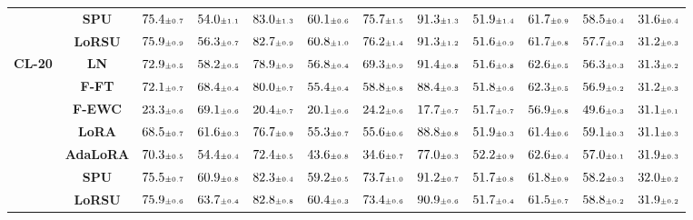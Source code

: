 \begin{table}
\begin{center}
\begin{small}
\begin{tabular}{l c c c c c c c c c c c}
& \textbf{SPU} & $75.4 \mtiny{\pm 0.7}$ & $54.0 \mtiny{\pm 1.1}$ & $83.0 \mtiny{\pm 1.3}$ & $60.1 \mtiny{\pm 0.6}$ & $75.7 \mtiny{\pm 1.5}$ & $91.3 \mtiny{\pm 1.3}$ & $51.9 \mtiny{\pm 1.4}$ & $61.7 \mtiny{\pm 0.9}$ & $58.5 \mtiny{\pm 0.4}$ & $31.6 \mtiny{\pm 0.4}$ \\
& \textbf{LoRSU} & $75.9 \mtiny{\pm 0.9}$ & $56.3 \mtiny{\pm 0.7}$ & $82.7 \mtiny{\pm 0.9}$ & $60.8 \mtiny{\pm 1.0}$ & $76.2 \mtiny{\pm 1.4}$ & $91.3 \mtiny{\pm 1.2}$ & $51.6 \mtiny{\pm 0.9}$ & $61.7 \mtiny{\pm 0.8}$ & $57.7 \mtiny{\pm 0.3}$ & $31.2 \mtiny{\pm 0.3}$ \\
\midrule
\multirow{7}{*}{\textbf{CL-20}} & \textbf{LN} & $72.9 \mtiny{\pm 0.5}$ & $58.2 \mtiny{\pm 0.5}$ & $78.9 \mtiny{\pm 0.9}$ & $56.8 \mtiny{\pm 0.4}$ & $69.3 \mtiny{\pm 0.9}$ & $91.4 \mtiny{\pm 0.8}$ & $51.6 \mtiny{\pm 0.8}$ & $62.6 \mtiny{\pm 0.5}$ & $56.3 \mtiny{\pm 0.3}$ & $31.3 \mtiny{\pm 0.2}$ \\
& \textbf{F-FT} & $72.1 \mtiny{\pm 0.7}$ & $68.4 \mtiny{\pm 0.4}$ & $80.0 \mtiny{\pm 0.7}$ & $55.4 \mtiny{\pm 0.4}$ & $58.8 \mtiny{\pm 0.8}$ & $88.4 \mtiny{\pm 0.3}$ & $51.8 \mtiny{\pm 0.6}$ & $62.3 \mtiny{\pm 0.5}$ & $56.9 \mtiny{\pm 0.2}$ & $31.2 \mtiny{\pm 0.3}$ \\
& \textbf{F-EWC} & $23.3 \mtiny{\pm 0.6}$ & $69.1 \mtiny{\pm 0.6}$ & $20.4 \mtiny{\pm 0.7}$ & $20.1 \mtiny{\pm 0.6}$ & $24.2 \mtiny{\pm 0.6}$ & $17.7 \mtiny{\pm 0.7}$ & $51.7 \mtiny{\pm 0.7}$ & $56.9 \mtiny{\pm 0.8}$ & $49.6 \mtiny{\pm 0.3}$ & $31.1 \mtiny{\pm 0.1}$ \\
& \textbf{LoRA} & $68.5 \mtiny{\pm 0.7}$ & $61.6 \mtiny{\pm 0.3}$ & $76.7 \mtiny{\pm 0.9}$ & $55.3 \mtiny{\pm 0.7}$ & $55.6 \mtiny{\pm 0.6}$ & $88.8 \mtiny{\pm 0.8}$ & $51.9 \mtiny{\pm 0.3}$ & $61.4 \mtiny{\pm 0.6}$ & $59.1 \mtiny{\pm 0.3}$ & $31.1 \mtiny{\pm 0.3}$ \\
& \textbf{AdaLoRA} & $70.3 \mtiny{\pm 0.5}$ & $54.4 \mtiny{\pm 0.4}$ & $72.4 \mtiny{\pm 0.5}$ & $43.6 \mtiny{\pm 0.8}$ & $34.6 \mtiny{\pm 0.7}$ & $77.0 \mtiny{\pm 0.3}$ & $52.2 \mtiny{\pm 0.9}$ & $62.6 \mtiny{\pm 0.4}$ & $57.0 \mtiny{\pm 0.1}$ & $31.9 \mtiny{\pm 0.3}$ \\
& \textbf{SPU} & $75.5 \mtiny{\pm 0.7}$ & $60.9 \mtiny{\pm 0.8}$ & $82.3 \mtiny{\pm 0.4}$ & $59.2 \mtiny{\pm 0.5}$ & $73.7 \mtiny{\pm 1.0}$ & $91.2 \mtiny{\pm 0.7}$ & $51.7 \mtiny{\pm 0.8}$ & $61.8 \mtiny{\pm 0.9}$ & $58.2 \mtiny{\pm 0.3}$ & $32.0 \mtiny{\pm 0.2}$ \\
& \textbf{LoRSU} & $75.9 \mtiny{\pm 0.6}$ & $63.7 \mtiny{\pm 0.4}$ & $82.8 \mtiny{\pm 0.8}$ & $60.4 \mtiny{\pm 0.3}$ & $73.4 \mtiny{\pm 0.6}$ & $90.9 \mtiny{\pm 0.6}$ & $51.7 \mtiny{\pm 0.4}$ & $61.5 \mtiny{\pm 0.7}$ & $58.8 \mtiny{\pm 0.2}$ & $31.9 \mtiny{\pm 0.2}$ \\

\end{tabular}
\end{small}
\end{center}
\end{table}
